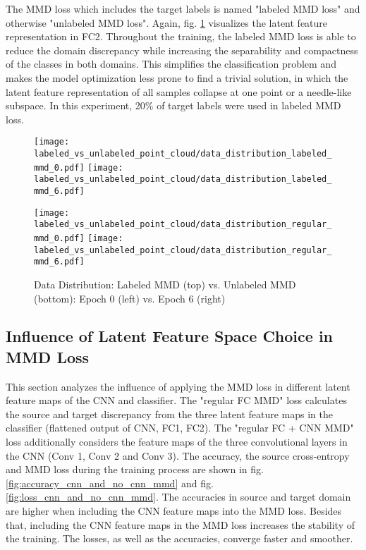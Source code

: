  The MMD loss which includes the target labels is named "labeled MMD loss" and otherwise "unlabeled MMD loss". Again, fig. \ref{fig:point_cloud_labeled_unlabeled_mmd} visualizes the latent feature representation in FC2. Throughout the training, the labeled MMD loss is able to reduce the domain discrepancy while increasing the separability and compactness of the classes in both domains. This simplifies the classification problem and makes the model optimization less prone to find a trivial solution, in which the latent feature representation of all samples collapse at one point or a needle-like subspace. In this experiment, 20\% of target labels were used in labeled MMD loss.
\begin{figure}[H]
  \centering
  \texttt{[image: labeled\_vs\_unlabeled\_point\_cloud/data\_distribution\_labeled\_mmd\_0.pdf]}
  \hspace{.4cm}
  \texttt{[image: labeled\_vs\_unlabeled\_point\_cloud/data\_distribution\_labeled\_mmd\_6.pdf]}

  \vspace{.1cm}

  \texttt{[image: labeled\_vs\_unlabeled\_point\_cloud/data\_distribution\_regular\_mmd\_0.pdf]}
  \hspace{.4cm}
  \texttt{[image: labeled\_vs\_unlabeled\_point\_cloud/data\_distribution\_regular\_mmd\_6.pdf]}
  
  \caption{Data Distribution: Labeled MMD (top) vs. Unlabeled MMD (bottom): Epoch 0 (left) vs. Epoch 6 (right)}
  \label{fig:point_cloud_labeled_unlabeled_mmd}
\end{figure}

\subsection{Influence of Latent Feature Space Choice in MMD Loss}
\label{cnn_mmd_dummy}
This section analyzes the influence of applying the MMD loss in different latent feature maps of the CNN and classifier. The "regular FC MMD" loss calculates the source and target discrepancy from the three latent feature maps in the classifier (flattened output of CNN, FC1, FC2). The "regular FC + CNN MMD" loss additionally considers the feature maps of the three convolutional layers in the CNN (Conv 1, Conv 2 and Conv 3). The accuracy, the source cross-entropy and MMD loss during the training process are shown in fig. \ref{fig:accuracy_cnn_and_no_cnn_mmd} and fig. \ref{fig:loss_cnn_and_no_cnn_mmd}. The accuracies in source and target domain are higher when including the CNN feature maps into the MMD loss. Besides that, including the CNN feature maps in the MMD loss increases the stability of the training. The losses, as well as the accuracies, converge faster and smoother.

